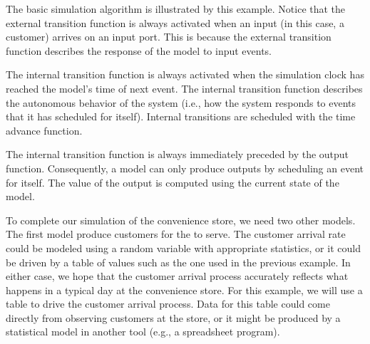 The basic simulation algorithm is illustrated by this example. Notice
that the external transition function is always activated when an
input (in this case, a customer) arrives on an input port. This is
because the external transition function describes the response of
the model to input events. 

The internal transition function is always
activated when the simulation clock has reached the model's time of
next event. The internal transition function describes the autonomous
behavior of the system (i.e., how the system responds to events that
it has scheduled for itself). Internal transitions are scheduled with
the time advance function.

The internal transition function is
always immediately preceded by the output function. Consequently, a
model can only produce outputs by scheduling an event for itself. The
value of the output is computed using the current state of the model.

To complete our simulation of the convenience store, we need two
other  models. The first model produce customers for the
 to serve. The customer arrival rate could be modeled using a
random variable with appropriate statistics, or
it could be driven by a table of values such as the one used in the
previous example. In either case, we hope that the customer arrival
process accurately reflects what happens in a typical day at the
convenience store. For this example, we will use a table to drive the
customer arrival process. Data for this table could come directly
from observing customers at the store, or it might be produced by a
statistical model in another tool (e.g., a spreadsheet program). 

